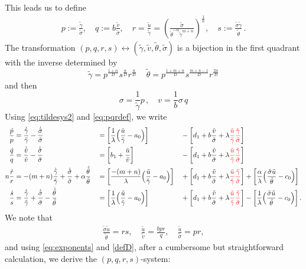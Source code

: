 \documentclass[a4paper,11pt]{article}
\def\red{\color{red}}
\def\tg{{\tilde{\gamma}}}
\def\tv{{\tilde{v}}}
\def\tth{{\tilde{\theta}}}
\def\ts{{\tilde{\sigma}}}
\def\tu{{\tilde{u}}}
\def\dtg{{\dot{\tilde{\gamma}}}}
\def\dtv{{\dot{\tilde{v}}}}
\def\dtth{{\dot{\tilde{\theta}}}}
\def\dts{{\dot{\tilde{\sigma}}}}
\def\dpp{\dot{p}}
\def\dqq{\dot{q}}
\def\drr{\dot{r}}
\theoremstyle{remark}
\begin{document}
This leads us to define
\begin{equation}\label{eq:pqrdef} 
 \begin{aligned}
  p :=\frac{\tg}{\ts}, \quad q :=b \frac{\tv}{\ts},  \quad r = \frac{\tu}{\tg} = \left ( \frac{\ts}{ \tth^{-\alpha} \tg^{m+n}} \right )^\frac{1}{n}  , \quad s := \frac{\ts\tg}{\tth} \, .
 \end{aligned}
\end{equation}
The transformation $(p,q,r,s) \leftrightarrow (\tg,\tv, \tth,\ts)$ is a bijection in the first quadrant with the inverse determined by
$$
\tg = p^\frac{1+\alpha}{D} s^\frac{\alpha}{D} r^\frac{n}{D} \, \quad \tth = p^\frac{1+m+n}{D} s^\frac{m+n-1}{D} r^\frac{2n}{D}
$$
and then
$$
\sigma = \frac{1}{\tg} p \, , \quad v = \frac{1}{b} \sigma \, q
$$
Using \eqref{eq:tildesys2} and \eqref{eq:pqrdef}, we write
\begin{align*}
 \frac{\dpp}{p}&=\frac{\dtg}{\tg} - \frac{\dts}{\ts}& &=\left[\frac{1}{\lambda }\Big(\frac{\tu}{\tg}-a_0\Big)\right] & &-\left[d_1 + b\frac{\tv}{\ts} + 
 \lambda   {\red  \frac{\tu}{\tg} \frac{\tg}{\ts}   }  \right]
 \\
 \frac{\dqq}{q}&=\frac{\dtv}{\tv} - \frac{\dts}{\ts}& &=\left[b_1 +\frac{\tu}{\tv}\right] & &-\left[d_1 + b\frac{\tv}{\ts} + \lambda  {\red  \frac{\tu}{\tg} \frac{\tg}{\ts}   }   \right]
 \\
 n\frac{\drr}{r}&=-(m+n)\frac{\dtg}{\tg}+\frac{\dts}{\ts} + \alpha\frac{\dtth}{\tth} & &=\left[\frac{-(m+n)}{\lambda}\Big(\frac{\tu}{\tg}-a_0\Big)\right]& &+\left[d_1 + b\frac{\tv}{\ts} + \lambda  {\red  \frac{\tu}{\tg} \frac{\tg}{\ts} }  \right] + \left[\frac{\alpha}{\lambda }\Big(\frac{\ts\tu}{\tth}-c_0\Big)\right]\\
 \frac{\dot{s}}{s} &= \frac{\dtg}{\tg} + \frac{\dts}{\ts} - \frac{\dtth}{\tth} & &=\left[\frac{1}{\lambda }\Big(\frac{\tu}{\tg}-a_0\Big)\right] & &+\left[d_1 + b\frac{\tv}{\ts} 
 + \lambda  {\red  \frac{\tu}{\tg} \frac{\tg}{\ts} }  \right] -\left[\frac{1}{\lambda }\Big(\frac{\ts\tu}{\tth}-c_0\Big)\right].%
\end{align*}
We note that
\begin{align*}
 \frac{\ts\tu}{\tth} = rs, \quad \frac{\tu}{\tv} = \frac{bpr}{q}, \quad \frac{\tu}{\ts} = pr,
\end{align*}
and using \eqref{eq:exponents} and \eqref{defD}, after a cumbersome but straightforward calculation, we derive the $(p,q,r,s)$-system:
\end{document}

